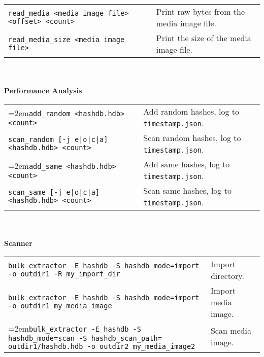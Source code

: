 \begin{footnotesize}
\begin{tabular}{p{3.6 in} p{3.0 in}}
\texttt{read\_media <media image file> <offset> <count>} & Print raw bytes from the media image file.\\
\texttt{read\_media\_size <media image file>} & Print the size of the media image file.\\
\end{tabular}
\\
\\
\textbf{Performance Analysis}\\
\begin{tabular}{p{3.6 in} p{4 in}}
\hangindent=2em\texttt{add\_random <hashdb.hdb> <count>} & Add random hashes, log to \texttt{timestamp.json}.\\
\texttt{scan\_random [-j e|o|c|a] <hashdb.hdb> <count>} & Scan random hashes, log to \texttt{timestamp.json}.\\
\hangindent=2em\texttt{add\_same <hashdb.hdb> <count>} & Add same hashes, log to \texttt{timestamp.json}.\\
\texttt{scan\_same [-j e|o|c|a] <hashdb.hdb> <count>} & Scan same hashes, log to \texttt{timestamp.json}.\\
\end{tabular}
\\
\\
\textbf{\bulk Scanner}\\
\begin{tabular}{p{5.6 in} p{2 in}}
\texttt{bulk\_extractor -E hashdb -S hashdb\_mode=import -o outdir1 -R my\_import\_dir} & Import directory.\\
\texttt{bulk\_extractor -E hashdb -S hashdb\_mode=import -o outdir1 my\_media\_image} & Import media image.\\
\hangindent=2em\texttt{bulk\_extractor -E hashdb -S hashdb\_mode=scan -S hashdb\_scan\_path= outdir1/hashdb.hdb -o outdir2 my\_media\_image2} & Scan media image.\\
\end{tabular}
\end{footnotesize}

